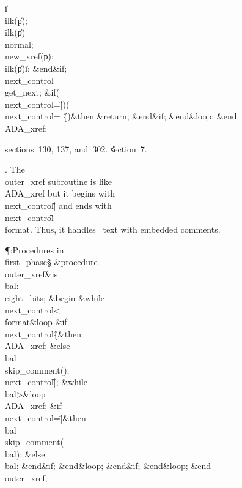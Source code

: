 \|i\?\K\?\\{ilk}\?\1(\?\|p\?\2)\?;\5
\\{ilk}\?\1(\?\|p\?\2)\K\?\\{normal};\5
\\{new\_xref}\?\1(\?\|p\?\2)\?;\5
\\{ilk}\?\1(\?\|p\?\2)\K\?\|i;\2\6
\&{end}\8\2\&{if}\1;\6
\\{next\_control}\?\K\?\\{get\_next};\6
\&{if}\1\1\?\8\1(\?\\{next\_control}\?=\?\H{|}\?\2)\V\1(\?\\{next\_control}\?=%
\?\H{\{}\?\2)\?\2\8\&{then}\6
\&{return};\2\6
\&{end}\8\2\&{if}\1;\2\6
\&{end}\8\&{loop};\2\6
\&{end}\8\\{ADA\_xref};\par
\A sections~130, 137, and~302.
\U section~7\*.\fi

. The \\{outer\_xref} subroutine is like \\{ADA\_xref} but it begins
with \\{next\_control}\?\I\?\H{|} and ends with \\{next\_control}\?\G\?%
\\{format}. Thus, it
handles \ADA\ text with embedded comments.

\Y\P\?\4:Procedures in \\{first\_phase}\X\mathrel{+}\S\?\6
\&{procedure}\8\1\\{outer\_xref}\2\8\&{is}\8\1\6
\\{bal}\?:\?\\{eight\_bits};\6
\4\&{begin}\6
\1\&{while}\8\\{next\_control}\?<\?\\{format}\8\&{loop}\6
\&{if}\1\1\8\\{next\_control}\?\I\?\H{\{}\2\8\&{then}\6
\\{ADA\_xref};\6
\4\&{else}\6
\\{bal}\?\K\?\\{skip\_comment}\?\1(\?\2)\?;\5
\\{next\_control}\?\K\?\H{|};\6
\1\&{while}\8\\{bal}\?>\8\&{loop}\6
\\{ADA\_xref};\6
\&{if}\1\1\8\\{next\_control}\?=\?\H{|}\2\8\&{then}\6
\\{bal}\?\K\?\\{skip\_comment}\?\1(\?\\{bal}\?\2)\?;\6
\4\&{else}\6
\\{bal}\?\K{};\2\6
\&{end}\8\2\&{if}\1;\2\6
\&{end}\8\&{loop};\2\6
\&{end}\8\2\&{if}\1;\2\6
\&{end}\8\&{loop};\2\6
\&{end}\8\\{outer\_xref};\par
\fi

